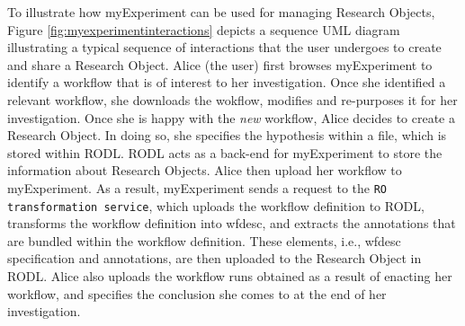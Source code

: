 To illustrate how myExperiment can be used for managing Research Objects, Figure \ref{fig:myexperimentinteractions} depicts a sequence UML diagram illustrating a typical sequence of interactions that the user undergoes to create and share a Research Object. Alice (the user) first browses myExperiment to identify a workflow that is of interest to her investigation. Once she identified a relevant workflow, she downloads the wokflow, modifies and re-purposes it for her investigation. Once she is happy with the \emph{new} workflow, Alice decides to create a Research Object. In doing so, she specifies the hypothesis within a file, which is stored within RODL. RODL acts as a back-end for myExperiment to store the information about Research Objects. Alice then upload her workflow to myExperiment. As a result, myExperiment sends a request to the \texttt{RO transformation service}, which uploads the workflow definition to RODL, transforms the workflow definition into wfdesc, and extracts the annotations that are bundled within the workflow definition. These elements, i.e., wfdesc specification and annotations, are then uploaded to the Research Object in RODL. Alice also uploads the workflow runs obtained as a result of enacting her workflow, and specifies the conclusion she comes to at the end of her investigation. 

